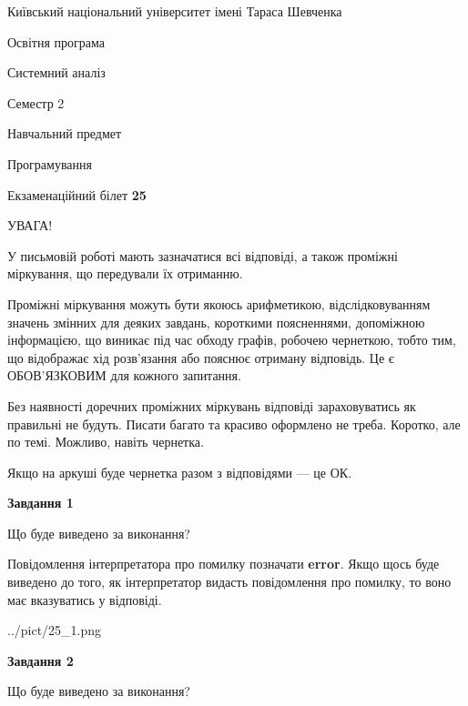 \documentclass[12pt, ukrainian]{article}
\begin{document}
{{\begin {small}\par
{ \center  Київський національний університет імені Тараса Шевченка \par}
{\parbox {5 cm}{Освітня програма \hfill}{\parbox {7 cm}{Системний аналіз \hfill}}\parbox {6 cm}{\hfill Семестр 2}}\par
{\parbox {5 cm} {Навчальний предмет \hfill}\parbox {7 cm}{Програмування \hfill}\parbox {6cm}{\hfill}\par}\vspace{-7pt} \end{small}}{\center Екзаменаційний білет \No \textbf
{ 25 }\par}}
{
\begin {large}
УВАГА!

У письмовій роботі мають зазначатися всі відповіді, а також проміжні міркування, що передували їх отриманню.

Проміжні міркування можуть бути якоюсь арифметикою, відслідковуванням зна\-чень змінних для деяких завдань,
короткими поясненнями, допоміжною інформацією, що виникає під час обходу графів, робочею чернеткою,
тобто тим, що відображає хід розв’язання або пояснює отриману відповідь.
Це є ОБОВ’ЯЗКОВИМ для кожного запитання.

Без наявності доречних проміжних міркувань відповіді зараховуватись як правиль\-ні не будуть.
Писати багато та красиво оформлено не треба. Коротко, але по темі. Можли\-во, навіть чернетка.

Якщо на аркуші буде чернетка разом з відповідями --- це ОК.

\newpage

{\begin {center}\textbf{Завдання 1}\end {center}}\par
Що буде виведено за виконання?

Повідомлення інтерпретатора про помилку позначати \textbf{error}.
Якщо щось буде виведено до того, як інтерпретатор видасть повідомлення про помилку, 
то воно має вказуватись у відповіді. \par


\begin{center}
	{../pict/25_1.png}
\end{center}
\newpage

{\begin {center}\textbf{Завдання 2}\end {center}}\par
Що буде виведено за виконання?


\end{large}}
\end{document}

